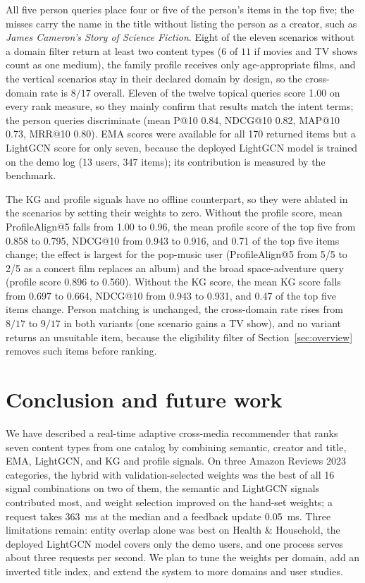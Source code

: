 \documentclass[3p,times,procedia]{elsarticle}
\begin{document}
All five person queries place four or five of the person's items in the top five; the misses carry the name in the title without listing the person as a creator, such as \emph{James Cameron's Story of Science Fiction}. Eight of the eleven scenarios without a domain filter return at least two content types ($6$ of $11$ if movies and TV shows count as one medium), the family profile receives only age-appropriate films, and the vertical scenarios stay in their declared domain by design, so the cross-domain rate is $8/17$ overall. Eleven of the twelve topical queries score 1.00 on every rank measure, so they mainly confirm that results match the intent terms; the person queries discriminate (mean P@10 0.84, NDCG@10 0.82, MAP@10 0.73, MRR@10 0.80). EMA scores were available for all 170 returned items but a LightGCN score for only seven, because the deployed LightGCN model is trained on the demo log (13 users, 347 items); its contribution is measured by the benchmark.

The KG and profile signals have no offline counterpart, so they were ablated in the scenarios by setting their weights to zero. Without the profile score, mean ProfileAlign@5 falls from 1.00 to 0.96, the mean profile score of the top five from 0.858 to 0.795, NDCG@10 from 0.943 to 0.916, and 0.71 of the top five items change; the effect is largest for the pop-music user (ProfileAlign@5 from 5/5 to 2/5 as a concert film replaces an album) and the broad space-adventure query (profile score 0.896 to 0.560). Without the KG score, the mean KG score falls from 0.697 to 0.664, NDCG@10 from 0.943 to 0.931, and 0.47 of the top five items change. Person matching is unchanged, the cross-domain rate rises from $8/17$ to $9/17$ in both variants (one scenario gains a TV show), and no variant returns an unsuitable item, because the eligibility filter of Section~\ref{sec:overview} removes such items before ranking.

\section{Conclusion and future work}
\label{sec:conclusion}
We have described a real-time adaptive cross-media recommender that ranks seven content types from one catalog by combining semantic, creator and title, EMA, LightGCN, and KG and profile signals. On three Amazon Reviews 2023 categories, the hybrid with validation-selected weights was the best of all 16 signal combinations on two of them, the semantic and LightGCN signals contributed most, and weight selection improved on the hand-set weights; a request takes 363~ms at the median and a feedback update 0.05~ms. Three limitations remain: entity overlap alone was best on Health \& Household, the deployed LightGCN model covers only the demo users, and one process serves about three requests per second. We plan to tune the weights per domain, add an inverted title index, and extend the system to more domains and user studies.
\end{document}
